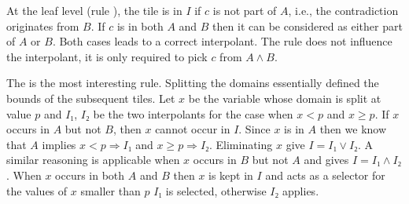 At the leaf level (rule \thLemI), the tile is in $I$ if $c$ is not part of $A$, i.e., the contradiction originates from $B$.
If $c$ is in both $A$ and $B$ then it can be considered as either part of $A$ or $B$.
Both cases leads to a correct interpolant.
The \weakenI rule does not influence the interpolant, it is only required to pick $c$ from $A ∧ B$.

The \spltI is the most interesting rule.
Splitting the domains essentially defined the bounds of the subsequent tiles.
Let $x$ be the variable whose domain is split at value $p$ and $I₁$, $I₂$ be the two interpolants for the case when $x < p$ and $x ≥ p$.
If $x$ occurs in $A$ but not $B$, then $x$ cannot occur in $I$.
Since $x$ is in $A$ then we know that $A$ implies $x < p ⇒ I₁$ and $x ≥ p ⇒ I₂$.
Eliminating $x$ give $I = I₁ ∨ I₂$.
A similar reasoning is applicable when $x$ occurs in $B$ but not $A$ and gives $I = I₁ ∧ I₂$.
When $x$ occurs in both $A$ and $B$ then $x$ is kept in $I$ and acts as a selector for the values of $x$ smaller than $p$ $I₁$ is selected, otherwise $I₂$ applies.

